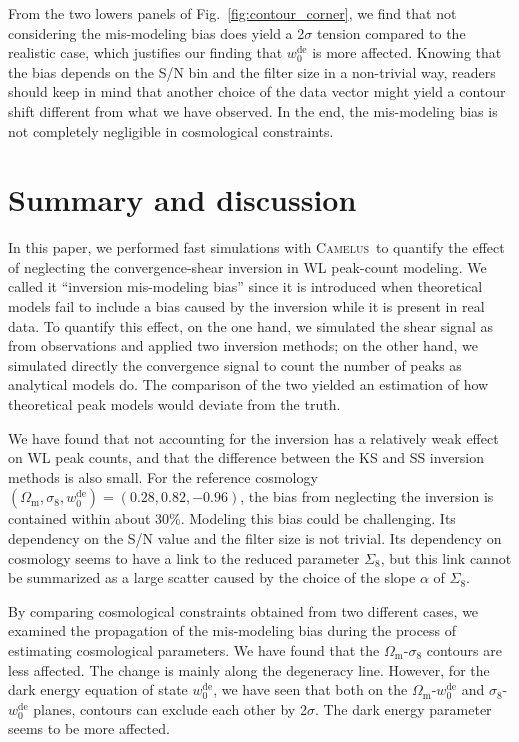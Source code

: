 \documentclass{aa} %
\newcommand{\fig}[1]{Fig.~\ref{#1}}
\newcommand{\OmegaM}{\Omega_\mathrm{m}}
\newcommand{\sigEig}{\sigma_8}
\newcommand{\wZero}{w_0^\mathrm{de}}
\newcommand{\Camelus}{\textsc{Camelus}}
\begin{document}
From the two lowers panels of \fig{fig:contour_corner}, we find that not considering the mis-modeling bias does yield a 2$\sigma$ tension compared to the realistic case, which justifies our finding that $\wZero$ is more affected. Knowing that the bias depends on the S/N bin and the filter size in a non-trivial way, readers should keep in mind that another choice of the data vector might yield a contour shift different from what we have observed. In the end, the mis-modeling bias is not completely negligible in cosmological constraints. 


\section{Summary and discussion}
\label{sect:summary}

In this paper, we performed fast simulations with \Camelus\ to quantify the effect of neglecting the convergence-shear inversion in WL peak-count modeling. We called it ``inversion mis-modeling bias'' since it is introduced when theoretical models fail to include a bias caused by the inversion while it is present in real data. To quantify this effect, on the one hand, we simulated the shear signal as from observations and applied two inversion methods; on the other hand, we simulated directly the convergence signal to count the number of peaks as analytical models do. The comparison of the two yielded an estimation of how theoretical peak models would deviate from the truth.

We have found that not accounting for the inversion has a relatively weak effect on WL peak counts, and that the difference between the KS and SS inversion methods is also small. For the reference cosmology $(\OmegaM, \sigEig, \wZero) = (0.28, 0.82, -0.96)$, the bias from neglecting the inversion is contained within about 30\%. Modeling this bias could be challenging. Its dependency on the S/N value and the filter size is not trivial. Its dependency on cosmology seems to have a link to the reduced parameter $\Sigma_8$, but this link cannot be summarized as a large scatter caused by the choice of the slope $\alpha$ of $\Sigma_8$.

By comparing cosmological constraints obtained from two different cases, we examined the propagation of the mis-modeling bias during the process of estimating cosmological parameters. We have found that the $\OmegaM$-$\sigEig$ contours are less affected. The change is mainly along the degeneracy line. However, for the dark energy equation of state $\wZero$, we have seen that both on the $\OmegaM$-$\wZero$ and $\sigEig$-$\wZero$ planes, contours can exclude each other by 2$\sigma$. The dark energy parameter seems to be more affected.
\end{document}

